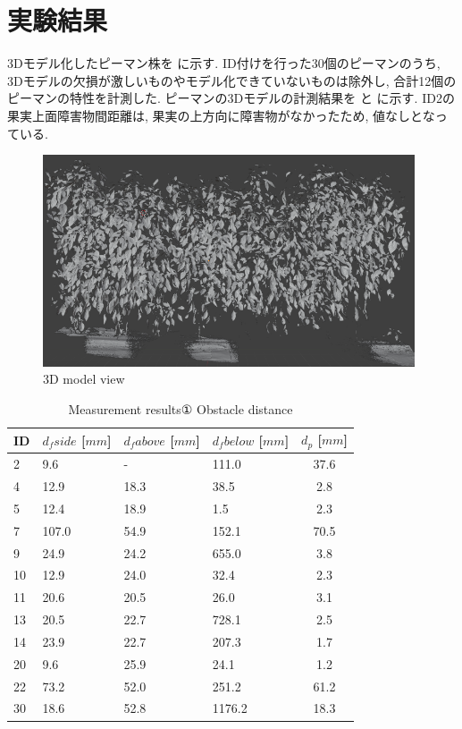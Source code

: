 \section{実験結果}
3Dモデル化したピーマン株を に示す.
ID付けを行った30個のピーマンのうち, 3Dモデルの欠損が激しいものやモデル化できていないものは除外し, 合計12個のピーマンの特性を計測した.
ピーマンの3Dモデルの計測結果を  と  に示す.
ID2の果実上面障害物間距離は, 果実の上方向に障害物がなかったため, 値なしとなっている.


\vspace{5mm}
\begin{figure}[H]
     \centering
     \includegraphics[width=110mm]{images/png/plant3d.png}
     \caption{3D model view}
     \label{Fig:plant3d}
   \end{figure}

\begin{table}[H]
  \begin{center}
    \begin{tabular}{l|p{30mm}p{30mm}p{30mm}c}
      ID & $d_fside$ [$mm$]& $d_fabove$ [$mm$]& $d_fbelow$ [$mm$]& $d_p$ [$mm$]\\ \hline\hline
      2 & 9.6 & - & 111.0 & 37.6\\
      4 & 12.9 & 18.3 & 38.5 & 2.8 \\
      5 & 12.4 & 18.9 & 1.5 & 2.3 \\
      7 & 107.0 & 54.9 & 152.1 & 70.5\\
      9 & 24.9 & 24.2 & 655.0 & 3.8\\
      10 & 12.9 & 24.0 & 32.4 & 2.3\\
      11 & 20.6 & 20.5 & 26.0 & 3.1\\
      13 & 20.5 & 22.7 & 728.1 & 2.5\\
      14 & 23.9 & 22.7 & 207.3 & 1.7\\
      20 & 9.6 & 25.9 & 24.1 & 1.2\\
      22 & 73.2 & 52.0 & 251.2 & 61.2\\
      30 & 18.6 & 52.8 & 1176.2 & 18.3\\
    \end{tabular}
    \caption{Measurement results① Obstacle distance}
    \label{Tab:measurementresults1}
  \end{center}
\end{table}


